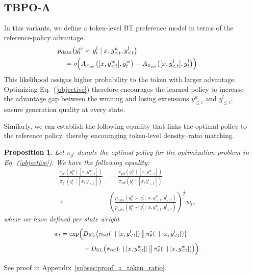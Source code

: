 \documentclass{article}
\theoremstyle{plain}
\newtheorem{proposition}[theorem]{Proposition}
\theoremstyle{definition}
\theoremstyle{remark}
\begin{document}
\subsection{TBPO-A}
\label{sec:tbpo_a}

In this variants, we define a token-level BT preference model in terms of the
reference-policy advantage.
\begin{equation}
\label{eq:BT_A}
\begin{split}
    &p_{\text{data}}\!\left(y_t^w \succ y_t^l \mid x, y_{<t}^w, y_{<t}^l\right) \\
    &\quad = \sigma\!\Bigl(
    A_{\pi_{\mathrm{ref}}}\bigl([x, y^w_{<t}], y^w_t\bigr)
    - A_{\pi_{\mathrm{ref}}}\bigl([x, y^l_{<t}], y^l_t\bigr)
    \Bigr)
\end{split}
\end{equation}
This likelihood assigns higher probability to the token with larger advantage.
Optimizing Eq.~(\ref{objective}) therefore encourages the learned policy to
increase the advantage gap between the winning and losing extensions
$y^w_{\le t}$ and $y^l_{\le t}$, ensure generation quality at every state.

Similarly, we can establish the following equality that links the optimal policy to the reference policy, thereby encouraging token-level density--ratio matching. 
\begin{proposition}
\label{pro:a_token_ratio}
    Let $\pi_{\theta^*}$ denote the optimal policy for the optimization problem in Eq. (\ref{objective}). We have the following equality:
    \begin{equation}
    \begin{split}\frac{\pi_{\theta^*}\!\left(y_{t}^{w}\mid[x,y_{<t}^{w}]\right)}{\pi_{\theta^*}\!\left(y_{t}^{l}\mid[x,y_{<t}^{l}]\right)} & =\frac{\pi_{\mathrm{ref}}\!\left(y_{t}^{w}\mid[x,y_{<t}^{w}]\right)}{\pi_{\mathrm{ref}}\!\left(y_{t}^{l}\mid[x,y_{<t}^{l}]\right)}\\
\times & \left(\frac{p_{\text{data}}(y_{t}^{w}\succ y_{t}^{l}\mid x,y_{<t}^{w},y_{<t}^{l})}{p_{\text{data}}(y_{t}^{w}\prec y_{t}^{l}\mid x,y_{<t}^{w},y_{<t}^{l})}\right)^{\frac{1}{\beta}}w_{t},
\end{split}    
\end{equation}
    where we have defined per state weight
    \begin{equation*}
    \small
    \begin{split}
        w_t = \exp\Bigl( &D_{\mathrm{KL}}\bigl(\pi_{\mathrm{ref}}(\cdot\mid [x,y^l_{<t}]) \,\big\|\, \pi_{\theta}^{*}(\cdot\mid [x,y^l_{<t}])\bigr) \\
        &- D_{\mathrm{KL}}\bigl(\pi_{\mathrm{ref}}(\cdot\mid [x,y^w_{<t}]) \,\big\|\, \pi_{\theta}^{*}(\cdot\mid [x,y^w_{<t}])\bigr) \Bigr).
    \end{split}
    \end{equation*}
\end{proposition}
See proof in Appendix~\ref{subsec:proof_a_token_ratio}.
\end{document}
